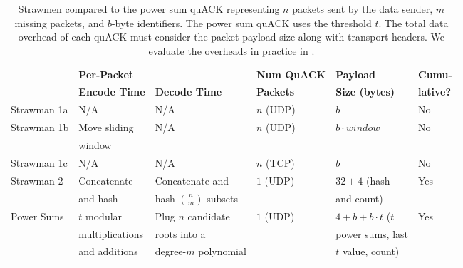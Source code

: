 \begin{table*}[ht]
  \centering
  \small
  \begin{tabular}{llllll}
    \toprule
    & \bf Per-Packet & \bf & \bf Num QuACK & \bf Payload & \bf Cumu-\\
    & \bf Encode Time & \bf Decode Time & \bf Packets & \bf Size (bytes) & \bf lative?\\
    \midrule
    Strawman 1a & N/A & N/A & $n$ (UDP) & $b$ & No \\
    Strawman 1b & Move sliding & N/A & $n$ (UDP) & $b \cdot window$ & No \\
    & window  & & & & \\
    Strawman 1c & N/A & N/A & $n$ (TCP) & $b$ & No \\
    Strawman 2 & Concatenate & Concatenate and & $1$ (UDP) & $32+4$ (hash & Yes \\
    & and hash & hash $\binom{n}{m}$ subsets & & and count) & \\
    Power Sums & $t$ modular & Plug $n$ candidate & $1$ (UDP) & $4+b+b\cdot t$ ($t$ & Yes \\
    & multiplications & roots into a & & power sums, last & \\
    & and additions & degree-$m$ polynomial & & $t$ value, count) & \\
    \bottomrule
  \end{tabular}
  \caption{Strawmen compared to the power sum quACK representing $n$ packets
  sent by the data sender, $m$ missing packets, and $b$-byte identifiers. The
  power sum quACK uses the threshold $t$. The total data overhead of each
  quACK must consider the packet payload size along with transport headers.
  We evaluate the overheads in practice in .
  }
  \label{tab:strawmen-theoretical}
\end{table*}

